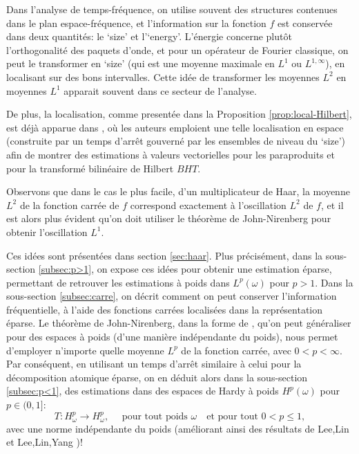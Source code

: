 \documentclass[11pt]{amsart}
\begin{document}
Dans l'analyse de temps-fr\'equence, on utilise souvent des structures contenues dans le plan espace-fr\'equence, et l'information sur la fonction $f$ est conserv\'ee dans deux quantit\'es: le `size' et l'`energy'. L'\'energie concerne plut\^ot l'orthogonalit\'e des paquets d'onde, et pour un op\'erateur de Fourier classique, on peut le transformer en `size' (qui est une moyenne maximale en $L^1$ ou $L^{1, \infty}$), en localisant sur des bons intervalles. Cette id\'ee de transformer les moyennes $L^2$ en moyennes $L^1$ apparait souvent dans ce secteur de l'analyse.

De plus, la localisation, comme present\'ee dans la Proposition \ref{prop:local-Hilbert}, est d\'ej\`a apparue dans \cite{vv_BHT}, o\`u les auteurs emploient une telle localisation en espace (construite par un temps d'arr\^et gouvern\'e par les ensembles de niveau du `size') afin de montrer des estimations \`a valeurs vectorielles pour les paraproduits et pour la transform\'e bilin\'eaire de Hilbert $BHT$.


Observons que dans le cas le plus facile, d'un multiplicateur de Haar, la moyenne $L^2$ de la fonction carr\'ee de $f$ correspond exactement \`a l'oscillation $L^2$ de $f$, et il est alors plus \'evident qu'on doit utiliser le th\'eor\`eme de John-Nirenberg pour obtenir l'oscillation $L^1$. 

Ces id\'ees sont pr\'esent\'ees dans section \ref{sec:haar}. Plus pr\'ecis\'ement, dans la sous-section \ref{subsec:p>1}, on expose ces id\'ees pour obtenir une estimation \'eparse, permettant de retrouver les estimations \`a poids dans $L^p(\omega)$ pour $p>1$. Dans la sous-section \ref{subsec:carre}, on d\'ecrit comment on peut conserver l'information fr\'equentielle, \`a l'aide des fonctions carr\'ees localis\'ees dans la repr\'esentation \'eparse. Le th\'eor\`eme de John-Nirenberg, dans la forme de \cite{multilinear_harmonic}, qu'on peut g\'en\'eraliser pour des espaces \`a poids (d'une mani\`ere ind\'ependante du poids), nous permet d'employer n'importe quelle moyenne $L^p$ de la fonction carr\'ee, avec $0<p <\infty$. Par cons\'equent, en utilisant un temps d'arr\^et similaire \`a celui pour la d\'ecomposition atomique \'eparse,  on en d\'eduit alors dans la sous-section \ref{subsec:p<1}, des estimations dans des espaces de Hardy \`a poids $H^p(\omega)$ pour $p\in(0,1]$:
\[
T: H^p_\omega \to H^p_\omega, \quad \text{ pour tout poids    } \omega \quad \text{et pour tout  }  0<p \leq 1,
\] 
avec une norme ind\'ependante du poids (am\'eliorant ainsi des r\'esultats de Lee,Lin \cite{LeeLin} et Lee,Lin,Yang \cite{LeeLinYang})!
\end{document}
